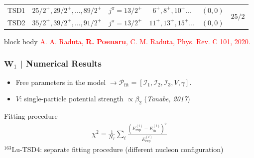 \documentclass{beamer}
\begin{document}
\begin{frame}
\begin{table}
{\begin{tabular}{cccccc}
			TSD1 & $25/2^+,29/2^+,\dots,89/2^+$ & $j^\pi=13/2^+$  & $6^+,8^+,10^+\dots$   & $(0,0)$             & \multirow{2}{*}{$25/2$} \\ \cline{1-5}
			TSD2 & $35/2^+,39/2^+,\dots,91/2^+$ & $j^\pi=13/2^+$  & $11^+,13^+,15^+\dots$ & $(0,0)$             &                         \\ \hline
		\end{tabular}%
		}
		\label{lu-167-experimental-data-table}
	\end{table}
	\begin{beamercolorbox}[rounded=true,shadow=false, wd=\linewidth,]{block body}
		\centering
		\textcolor{red}{\footnotesize{A. A. Raduta, \textbf{R. Poenaru}, C. M. Raduta, Phys. Rev. C 101, 2020.}}
	\end{beamercolorbox}
\end{frame}

\begin{frame}
	\frametitle{$\mathbf{W}_1$ | Numerical Results}
	\begin{itemize}
		\item Free parameters in the model $\rightarrow\mathcal{P}_\text{fit}=\left[\mathcal{I}_1,\mathcal{I}_2,\mathcal{I}_3,V,\gamma\right]$.
		\item $V$: single-particle potential strength $\propto\beta_2$ (\textit{Tanabe, 2017})
	\end{itemize}
	\begin{block}{Fitting procedure}
		\vspace{-0.4cm}
		\begin{align}
			\chi^2=\frac{1}{N_T}\sum_i\frac{\left(E_\text{exp}^{(i)}-E_\text{th}^{(i)}\right)^2}{E_\text{exp}^{(i)}}\nonumber
		\end{align}
		$^{163}$Lu-TSD4: separate fitting procedure (different nucleon configuration)
	\end{block}
	\begin{table}
		\centering
	\end{table}
\end{frame}
\end{document}
